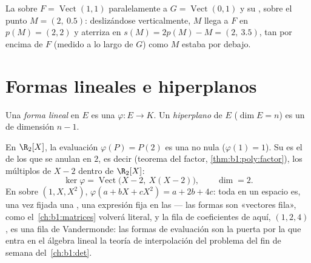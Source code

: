 \begin{omfigure}

{\small La  sobre $F = \operatorname{Vect}(1,1)$
paralelamente a $G = \operatorname{Vect}(0,1)$ y su , sobre
el punto $M = (2,\ 0.5)$: deslizándose verticalmente, $M$ llega a $F$
en $p(M) = (2,2)$ y aterriza en $s(M) = 2p(M) - M = (2,\ 3.5)$, tan
por encima de $F$ (medido a lo largo de $G$) como $M$ estaba por
debajo.}
\end{omfigure}

\section{Formas lineales e hiperplanos}

\begin{definition}\label{def:b1:linmaps:forms}
Una \emph{forma lineal} en $E$ es una
 $\varphi \colon E \to K$. Un
\emph{hiperplano} de $E$ ($\dim E = n$) es un
 de dimensión $n - 1$.
\end{definition}

\begin{example}
\label{ex:b1:linmaps:evaluationform}
En $\R_2[X]$, la evaluación $\varphi(P) = P(2)$ es una 
no nula ($\varphi(1) = 1$). Su  es el  de los
 que se anulan en $2$, es decir (teorema del factor,
\cref{thm:b1:poly:factor}), los múltiplos de $X - 2$ dentro de
$\R_2[X]$:
\[
\ker\varphi = \operatorname{Vect}\bigl(X - 2,\ X(X - 2)\bigr),
\qquad \dim = 2 .
\]
En  sobre $(1, X, X^2)$,
$\varphi(a + bX + cX^2) = a + 2b + 4c$: toda  en un
espacio  es, una vez fijada una , una
expresión  fija en las  --- las formas son
«vectores fila», como el~\cref{ch:b1:matrices} volverá literal, y la
fila de coeficientes de aquí, $(1, 2, 4)$, es una fila de
Vandermonde: las formas de evaluación son la puerta por la que entra
en el álgebra lineal la teoría de interpolación del problema del fin
de semana del~\cref{ch:b1:det}.
\end{example}

